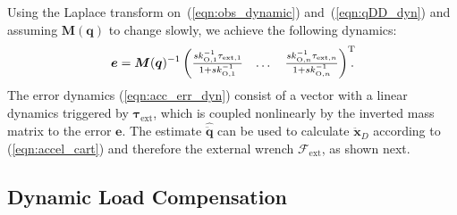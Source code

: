 %
Using the Laplace transform on~(\ref{eqn:obs_dynamic}) and~(\ref{eqn:qDD_dyn}) and assuming $\bm{M}(\bm{q})$ to change slowly, we achieve the following dynamics:
%
\begin{equation}
\bm{e}=\bm{M}(\bm{q})^{-1}\begin{pmatrix}\frac{sk_{\mathrm{O},1}^{-1}\tau_{\mathrm{ext},1}}{1+sk_{\mathrm{O},1}^{-1}} &\dots&\frac{sk_{\mathrm{O},n}^{-1}\tau_{\mathrm{ext},n}}{1+sk_{\mathrm{O},n}^{-1}}\end{pmatrix}^\mathrm{T}\hspace*{-2mm}.\label{eqn:acc_err_dyn}
\end{equation}
%
The error dynamics (\ref{eqn:acc_err_dyn}) consist of a vector with a linear dynamics triggered by $\bm{\tau}_\mathrm{ext}$, which is coupled nonlinearly by the inverted mass matrix to the error $\bm{e}$.
The estimate $\hat{\ddot{\bm{q}}}$ can be used to calculate $\ddot{\bm{x}}_D$ according to (\ref{eqn:accel_cart}) and therefore the external wrench $\bm{\mathcal{F}}_{\mathrm{ext}}$, as shown next.

\subsection{Dynamic Load Compensation}
\label{sec:load_comp}


